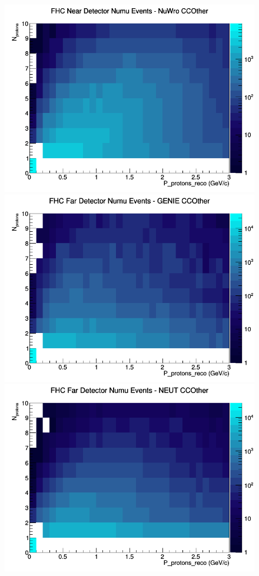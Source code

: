 \documentclass[12pt]{article}
\begin{document}
\begin{figure}[h]
\includegraphics[width=\linewidth]{eff_N_P/LAr/protons/CCOther_FHC_ND_numu_N_P_NuWro.png}
\endminipage
\newline
{}
\includegraphics[width=\linewidth]{eff_N_P/LAr/protons/CCOther_FHC_FD_numu_N_P_GENIE.png}
\endminipage
{}
\includegraphics[width=\linewidth]{eff_N_P/LAr/protons/CCOther_FHC_FD_numu_N_P_NEUT.png}

\end{figure}
\end{document}
